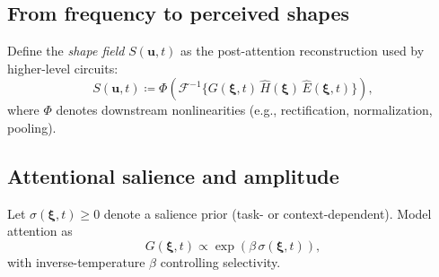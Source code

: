 \documentclass[12pt]{article}
\newcommand{\InvFourier}{\mathscr{F}^{-1}}
\begin{document}
\subsection{From frequency to perceived shapes}
Define the \emph{shape field} $S(\mathbf{u}, t)$ as the post-attention reconstruction used by higher-level circuits:
\begin{equation}
  S(\mathbf{u}, t) \coloneqq \Phi\!\left(\InvFourier\!\{G(\bm{\xi}, t)\,\widehat{H}(\bm{\xi})\,\widehat{E}(\bm{\xi}, t)\}\right),
\end{equation}
where $\Phi$ denotes downstream nonlinearities (e.g., rectification, normalization, pooling).

\subsection{Attentional salience and amplitude}
Let $\sigma(\bm{\xi},t)\ge 0$ denote a salience prior (task- or context-dependent). Model attention as
\begin{equation}
  G(\bm{\xi},t) \propto \exp\!\left(\beta\, \sigma(\bm{\xi},t)\right),
\end{equation}
with inverse-temperature $\beta$ controlling selectivity. %

\end{document}
